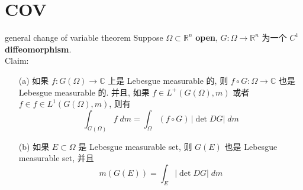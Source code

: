 \documentclass[lang=cn,11pt]{elegantbook}
\begin{document}
\section{COV}
\begin{theorem}{general change of variable theorem}
Suppose $\Omega \subset \mathbb{R}^n$ \textbf{open}, $G: \Omega \to \mathbb{R}^n$ 为一个 $C^1$ \textbf{diffeomorphism}.\\
Claim: 
\begin{itemize}
    \item[(a)] 如果 $f:G(\Omega)\to \mathbb{C}$ 上是 Lebesgue measurable 的, 则 $f \circ G:\Omega \to \mathbb{C}$ 也是 Lebesgue measurable 的. 并且, 如果 $f \in L^+(G(\Omega ),m)$ 或者 $f \in f \in L^1(G(\Omega ),m)$, 则有\[ \int _{G(\Omega)}  f\; dm = \int_\Omega (f\circ G) \, |\det DG |\; dm    \]
    \item[(b)]  如果 $E\subset \Omega$ 是 Lebesgue measurable set, 则 $G(E)$ 也是 Lebesgue measurable set, 并且 \[ m(G(E)) = \int_E |\det DG| \; dm  \]
\end{itemize}
\end{theorem}
\end{document}
